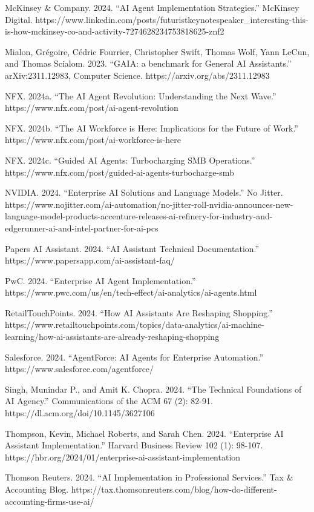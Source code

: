 \documentclass[
]{article}
\begin{document}
McKinsey \& Company. 2024. ``AI Agent Implementation Strategies.''
McKinsey Digital.
https://www.linkedin.com/posts/futuristkeynotespeaker\_interesting-this-is-how-mckinsey-co-and-activity-7274628234753818625-znf2

Mialon, Grégoire, Cédric Fourrier, Christopher Swift, Thomas Wolf, Yann
LeCun, and Thomas Scialom. 2023. ``GAIA: a benchmark for General AI
Assistants.'' arXiv:2311.12983, Computer Science.
https://arxiv.org/abs/2311.12983

NFX. 2024a. ``The AI Agent Revolution: Understanding the Next Wave.''
https://www.nfx.com/post/ai-agent-revolution

NFX. 2024b. ``The AI Workforce is Here: Implications for the Future of
Work.'' https://www.nfx.com/post/ai-workforce-is-here

NFX. 2024c. ``Guided AI Agents: Turbocharging SMB Operations.''
https://www.nfx.com/post/guided-ai-agents-turbocharge-smb

NVIDIA. 2024. ``Enterprise AI Solutions and Language Models.'' No
Jitter.
https://www.nojitter.com/ai-automation/no-jitter-roll-nvidia-announces-new-language-model-products-accenture-releases-ai-refinery-for-industry-and-edgerunner-ai-and-intel-partner-for-ai-pcs

Papers AI Assistant. 2024. ``AI Assistant Technical Documentation.''
https://www.papersapp.com/ai-assistant-faq/

PwC. 2024. ``Enterprise AI Agent Implementation.''
https://www.pwc.com/us/en/tech-effect/ai-analytics/ai-agents.html

RetailTouchPoints. 2024. ``How AI Assistants Are Reshaping Shopping.''
https://www.retailtouchpoints.com/topics/data-analytics/ai-machine-learning/how-ai-assistants-are-already-reshaping-shopping

Salesforce. 2024. ``AgentForce: AI Agents for Enterprise Automation.''
https://www.salesforce.com/agentforce/

Singh, Munindar P., and Amit K. Chopra. 2024. ``The Technical
Foundations of AI Agency.'' Communications of the ACM 67 (2): 82-91.
https://dl.acm.org/doi/10.1145/3627106

Thompson, Kevin, Michael Roberts, and Sarah Chen. 2024. ``Enterprise AI
Assistant Implementation.'' Harvard Business Review 102 (1): 98-107.
https://hbr.org/2024/01/enterprise-ai-assistant-implementation

Thomson Reuters. 2024. ``AI Implementation in Professional Services.''
Tax \& Accounting Blog.
https://tax.thomsonreuters.com/blog/how-do-different-accounting-firms-use-ai/
\end{document}
